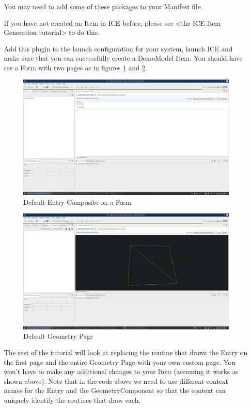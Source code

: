 \documentclass{article}
\begin{document}
You may need to add some of these packages to your Manifest file.

If you have not created an Item in ICE before, please see <the ICE Item
Generation tutorial> to do this.

Add this plugin to the launch configuration for your system, launch ICE and
make sure that you can successfully create a DemoModel Item. You should have
see a Form with two pages as in figures \ref{fig:iceDefaultEntryPage} and
\ref{fig:iceDefaultGeometryPage}.

\begin{figure}[h]
\includegraphics[width=\textwidth]{pics/dynamicUI_defaultEntryPage.png}
\caption{Default Entry Composite on a Form}
\label{fig:iceDefaultEntryPage}
\end{figure}

\begin{figure}[h]
\includegraphics[width=\textwidth]{pics/dynamicUI_defaultGeometryPage.png}
\caption{Default Geometry Page}
\label{fig:iceDefaultGeometryPage}
\end{figure}

The rest of the tutorial will look at replacing the routine that draws the
Entry on the first page and the entire Geometry Page with your own custom page.
You won’t have to make any additional changes to your Item (assuming it works
as shown above). Note that in the code above we need to use different context
names for the Entry and the GeometryComponent so that the context can uniquely
identify the routines that draw each.
\end{document}

